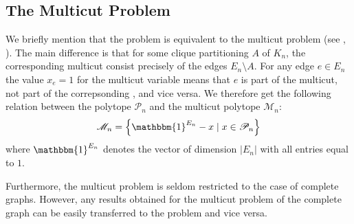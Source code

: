\subsection{The Multicut Problem}
We briefly mention that the \CP problem is equivalent to the multicut problem (see \eg \cite{chopraPartitionProblem1993}, \cite{dezaCliqueWebFacetsMulticut1992}).
The main difference is that for some clique partitioning $A$ of $K_{n}$, the corresponding multicut consist precisely of the edges $E_{n} \setminus A$.
For any edge $e \in E_{n}$ the value $x_{e} = 1$ for the multicut variable means that $e$ is part of the multicut, \ie not part of the correpsonding \CP, and vice versa.
We therefore get the following relation between the \CP polytope $\mathscr{P}_{n}$ and the multicut polytope $\mathscr{M}_{n}$:
\[
	\mathscr{M}_{n} = \left\{ \mathbbm{1}^{E_{n}} - x \mid x \in \mathscr{P}_{n} \right\}
\]
where $\mathbbm{1}^{E_{n}}$ denotes the vector of dimension $\lvert E_{n} \rvert$ with all entries equal to $1$.

Furthermore, the multicut problem is seldom restricted to the case of complete graphs.
However, any results obtained for the multicut problem of the complete graph can be easily transferred to the \CP problem and vice versa.
